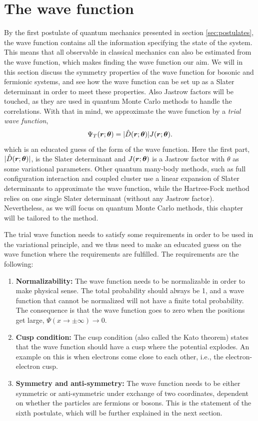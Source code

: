 \section{The wave function} \label{sec:wavefunction}
By the first postulate of quantum mechanics presented in section \ref{sec:postulates}, the wave function contains all the information specifying the state of the system. This means that all observable in classical mechanics can also be estimated from the wave function, which makes finding the wave function our aim. We will in this section discuss the symmetry properties of the wave function for bosonic and fermionic systems, and see how the wave function can be set up as a Slater determinant in order to meet these properties. Also Jastrow factors will be touched, as they are used in quantum Monte Carlo methods to handle the correlations. With that in mind, we approximate the wave function by a \textit{trial wave function},
\begin{equation}
\Psi_T(\boldsymbol{{r}};\boldsymbol{{\theta}})=|\hat{D}(\boldsymbol{{r}};\boldsymbol{{\theta}})|J(\boldsymbol{{r}};\boldsymbol{{\theta}}).
\end{equation}
which is an educated guess of the form of the wave function. 
Here the first part, $|\hat{D}(\boldsymbol{{r}};\boldsymbol{{\theta}})|$, is the Slater determinant and $J(\boldsymbol{{r}};\boldsymbol{{\theta}})$ is a Jastrow factor with $\theta$ as some variational parameters. Other quantum many-body methods, such as full configuration interaction and coupled cluster use a linear expansion of Slater determinants to approximate the wave function, while the Hartree-Fock method relies on one single Slater determinant (without any Jastrow factor). Nevertheless, as we will focus on quantum Monte Carlo methods, this chapter will be tailored to the method. 

The trial wave function needs to satisfy some requirements in order to be used in the variational principle, and we thus need to make an educated guess on the wave function where the requirements are fulfilled. The requirements are the following:

\begin{enumerate}
	\item \textbf{Normalizability:} The wave function needs to be normalizable in order to make physical sense. The total probability should always be 1, and a wave function that cannot be normalized will not have a finite total probability. The consequence is that the wave function goes to zero when the positions get large, $\Psi(x\rightarrow\pm\infty)\rightarrow 0$. 
	
	\item \textbf{Cusp condition:} The cusp condition (also called the Kato theorem) states that the wave function should have a cusp where the potential explodes. An example on this is when electrons come close to each other, i.e., the electron-electron cusp.
	
	\item \textbf{Symmetry and anti-symmetry:} The wave function needs to be either symmetric or anti-symmetric under exchange of two coordinates, dependent on whether the particles are fermions or bosons. This is the statement of the sixth postulate, which will be further explained in the next section.
\end{enumerate}

